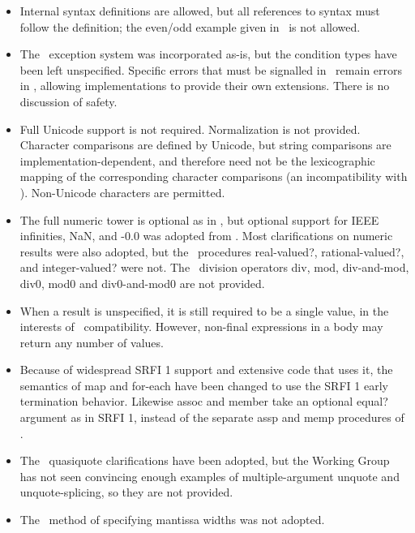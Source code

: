 \begin{itemize}
\item Internal syntax definitions are allowed, but all references to syntax
must follow the definition; the {\cf even}/{\cf odd} example given in
\rsixrs\ is not allowed.

\item The \rsixrs\ exception system was incorporated as-is, but the condition
types have been left unspecified.  Specific errors that must be signalled
in \rsixrs\ remain errors in \rsevenrs, allowing implementations to provide
their own extensions.  There is no discussion of safety.

\item Full Unicode support is not required.
Normalization is not provided.
Character comparisons are
defined by Unicode, but string comparisons are implementation-dependent,
and therefore need not be the lexicographic mapping of the corresponding
character comparisons (an incompatibility with \rfivers). Non-Unicode
characters are permitted.

\item The full numeric tower is optional as in \rfivers, but optional support for IEEE
infinities, NaN, and {\mbox -0.0} was adopted from \rsixrs. Most clarifications on
numeric results were also adopted, but the \rsixrs\ procedures {\cf real-valued?},
{\cf rational-valued?}, and {\cf integer-valued}? were not. 
The \rsixrs\ division operators {\cf div}, {\cf mod}, {\cf div-and-mod}, {\cf
div0}, {\cf mod0} and {\cf div0-and-mod0} are not provided.

\item When a result is unspecified, it is still required to be a single value,
in the interests of \rfivers\ compatibility. However, non-final expressions
in a body may return any number of values.

\item Because of widespread SRFI 1 support and extensive code
that uses it, the semantics of {\cf map} and {\cf for-each} have been changed to use
the SRFI 1 early termination behavior. Likewise
{\cf assoc} and {\cf member} take an optional {\cf equal?} argument as in SRFI 1,
instead of the separate {\cf assp} and {\cf memp} procedures of \rsixrs.

\item The \rsixrs~{\cf quasiquote} clarifications have been adopted, but the Working Group has not seen
convincing enough examples of multiple-argument {\cf unquote} and
{\cf unquote-splicing}, so they are not provided.

\item The \rsixrs~method of specifying mantissa widths was not adopted.

\end{itemize}

